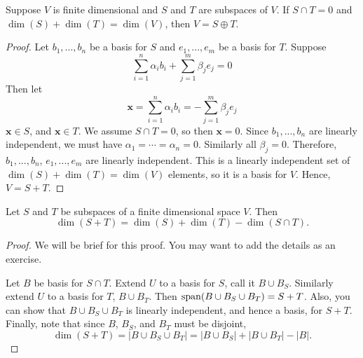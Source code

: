 \begin{lemma}\label{lem:dimisect}
  Suppose $V$ is finite dimensional and $S$ and $T$ are subspaces of
  $V$. If $S \cap T = 0$ and $\dim(S) + \dim(T) = \dim(V)$, then $V =
  S \oplus T$. 
\end{lemma}
\begin{proof}
  Let $b_1, ..., b_n$ be a basis for $S$ and $e_1, ..., e_m$ be a
  basis for $T$. Suppose 
  \[ \sum_{i=1}^n \alpha_i b_i +  \sum_{j=1}^m \beta_j e_j = 0 \]
  Then let
  \[ \mathbf{x} = \sum_{i=1}^n \alpha_i b_i = -\sum_{j=1}^m \beta_j
  e_j \]
  $\mathbf{x} \in S$, and $\mathbf{x} \in T$. We assume $S \cap T =
  0$, so then $\mathbf{x} = 0$. Since $b_1, ..., b_n$ are linearly
  independent, we must have $\alpha_1 = \cdots = \alpha_n =
  0$. Similarly all $\beta_j = 0$. Therefore, $b_1, ..., b_n$, $e_1,
  ..., e_m$ are linearly independent. This is a linearly independent
  set of $\dim(S) + \dim(T) = \dim(V)$ elements, so it is a basis for
  $V$. Hence, $V = S + T$. 
\end{proof}
\begin{lemma}\label{lem:dimSum}
  Let $S$ and $T$ be subspaces of a finite dimensional space $V$. Then
  \[ \dim(S + T) = \dim(S) + \dim(T) - \dim(S \cap T). \]
\end{lemma}
\begin{proof}
  We will be brief for this proof. You may want to add the details as
  an exercise. 
  
  Let $B$ be basis for $S \cap T$. Extend $U$ to a basis for $S$, call
  it $B \cup B_S$. Similarly extend $U$ to a basis for $T$, $B\cup
  B_T$. Then $\mathrm{span}(B \cup B_S \cup B_T) = S + T$. Also, you can show
  that $B \cup B_S \cup B_T$ is linearly independent, and hence a
  basis, for $S+T$. Finally, note that since $B$, $B_S$, and $B_T$ must
  be disjoint, 
  \[ \dim(S+T) = | B \cup B_S \cup B_T | = | B \cup B_S | + | B \cup
  B_T | - | B |. \]
\end{proof}


